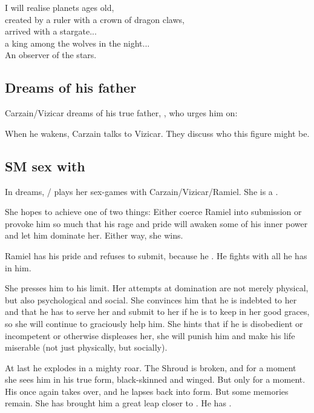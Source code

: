 \begin{garbage}
{  I will realise planets ages old, \\
  created by a ruler with a crown of dragon claws, \\
  arrived with a stargate... \\
  a king among the wolves in the night... \\
  An observer of the stars.
}









\subsection{Dreams of his father}
Carzain/Vizicar dreams of his true father, \hs{\Zachirah}, who urges him on: 

When he wakens, Carzain talks to Vizicar. 
They discuss who this  figure might be.  









\subsection{SM sex with \Belzir}
In dreams, \Belzir/\Shiaraid{} plays her sex-games with Carzain/Vizicar/Ramiel. 
She is a . 

She hopes to achieve one of two things: 
Either coerce Ramiel into submission or provoke him so much that his rage and pride will awaken some of his inner power and let him dominate her. 
Either way, she wins. 

Ramiel has his pride and refuses to submit, because he . 
He fights with all he has in him. 

She presses him to his limit. 
Her attempts at domination are not merely physical, but also psychological and social. 
She convinces him that he is indebted to her and that he has to serve her and submit to her if he is to keep in her good graces, so she will continue to graciously help him. 
She hints that if he is disobedient or incompetent or otherwise displeases her, she will punish him and make his life miserable (not just physically, but socially). 

At last he explodes in a mighty roar. 
The Shroud is broken, and for a moment she sees him in his true \resphan{} form, black-skinned and winged. 
But only for a moment. 
His \hs{\kenosis} once again takes over, and he lapses back into \human{} form. 
But some memories remain. 
She has brought him a great leap closer to \hs{\apotheosis}. 
He has . 


\end{garbage}
